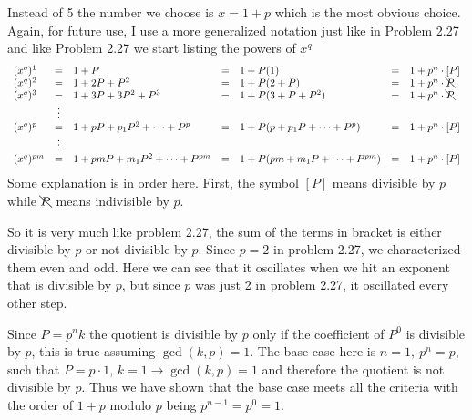 \documentclass[aps,preprint,preprintnumbers,nofootinbib,showpacs,prd]{revtex4-1}
\newcommand{\nbea}{\begin{eqnarray*}}
\newcommand{\neea}{\end{eqnarray*}}
\begin{document}
Instead of 5 the number we choose is $x = 1+p$ which is the most obvious choice. Again, for future use, I use a more generalized notation just like in Problem 2.27 and like Problem 2.27 we start listing the powers of $x^q$
%
\nbea
\begin{array} {l c l c l c l}
(x^{q})^1 & = & 1 + P & = & 1 + P(1) & = & 1 + p^n \cdot [P] \\
(x^{q})^2 & = & 1 + 2P + P^2 & = & 1 + P(2 + P) & = & 1 + p^n \cdot \bcancel{P} \\
(x^{q})^3 & = & 1 + 3P + 3P^2 + P^3 & = & 1 + P(3 + P + P^2) & = & 1 + p^n \cdot \bcancel{P} \\
& \vdots & & & & & \\
(x^{q})^p & = & 1 + pP + p_1P^2 + \dots + P^p & = & 1 + P(p + p_1P + \dots + P^p) & = & 1 + p^n \cdot [P] \\
& \vdots & & & & & \\
(x^{q})^{pm} & = & 1 + pmP + m_1P^2 + \dots + P^{pm} & = & 1 + P(pm + m_1P + \dots + P^{pm}) & = &  1 + p^n \cdot [P]
\end{array}
\neea
%
Some explanation is in order here. First, the symbol $[P]$ means divisible by $p$ while $\bcancel{P}$ means indivisible by $p$.

So it is very much like problem 2.27, the sum of the terms in bracket is either divisible by $p$ or not divisible by $p$. Since $p=2$ in problem 2.27, we characterized them even and odd. Here we can see that it oscillates when we hit an exponent that is divisible by $p$, but since $p$ was just 2 in problem 2.27, it oscillated every other step.

Since $P = p^n k$ the quotient is divisible by $p$ only if the coefficient of $P^0$ is divisible by $p$, this is true assuming $\gcd(k,p) = 1$. The base case here is $n=1, ~p^n=p$, such that $P = p \cdot 1$, $k=1 \to \gcd(k,p) = 1$ and therefore the quotient is not divisible by $p$. Thus we have shown that the base case meets all the criteria with the order of $1+p$ modulo $p$ being $p^{n-1} = p^0 = 1$.
\end{document}
